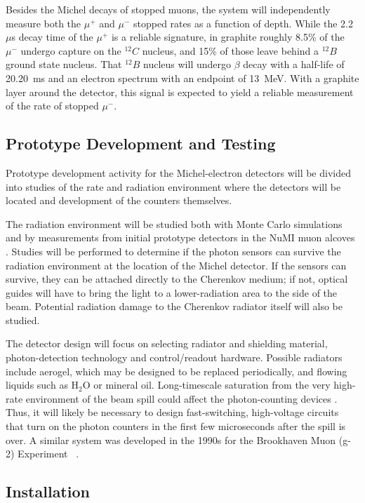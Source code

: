 Besides the Michel decays of stopped muons, the system will
independently measure both the $\mu ^{+}$ and $\mu ^{-}$ stopped
rates as a function of depth. 
While the 2.2~$\mu $s decay time of the $\mu^+$ is a reliable
signature, in graphite roughly 8.5\% of the $\mu^{-}$ undergo capture
on the $^{12}C$ nucleus, and 15\% of those leave behind a $^{12}B$
ground state nucleus. That $^{12}B$ nucleus will undergo $\beta$ decay
with a half-life of 20.20~ms and an electron spectrum with an endpoint
of 13~MeV. With a graphite layer around the detector, this signal is
expected to yield a reliable measurement of the rate of stopped
$\mu^{-}$.

\subsection{Prototype Development and Testing}

Prototype development activity for the Michel-electron detectors will
be divided into studies of the rate and radiation environment where
the detectors will be located and development of the counters
themselves.

The radiation environment will be studied both with Monte Carlo 
simulations and by
measurements from initial prototype detectors in the NuMI muon alcoves
\cite{ref:NuMIBeamMonitors}.
Studies will be performed to determine if the photon sensors
can survive the radiation environment at the location of the Michel
detector. If the sensors can survive, they can be attached directly to
the Cherenkov medium; if not, optical guides will have to bring the
light to a lower-radiation area to the side of the beam. Potential
radiation damage to the Cherenkov radiator itself will also be
studied.

The detector design will focus on selecting radiator and shielding
material, photon-detection technology and control/readout
hardware. Possible radiators include aerogel, which may be designed to
be replaced periodically, and flowing liquids such as H$_2$O or
mineral oil. Long-timescale saturation from the very high-rate
environment of the beam spill could affect the photon-counting devices
\cite{ref:HighRateCounting}. Thus, it will likely be necessary to
design fast-switching, high-voltage circuits that turn on the photon
counters in the first few microseconds after the spill is over. A
similar system was developed in the 1990s for the Brookhaven Muon
(g-2) Experiment~\cite{ref:G2} .

\subsection{Installation}

